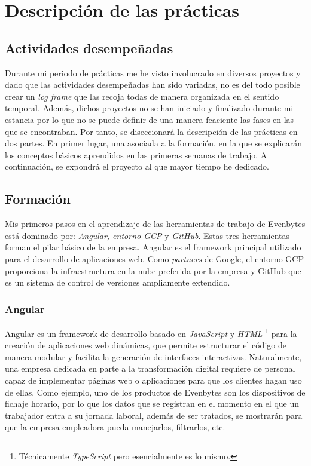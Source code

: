\chapter{Descripción de las prácticas} \label{descripcion de las practicas}
%
%
\section{Actividades desempeñadas} \label{Actividades desempeñadas}
%
Durante mi periodo de prácticas me he visto involucrado en diversos proyectos y dado que las actividades desempeñadas han sido variadas, no es del todo posible crear un \textit{log frame} que las recoja todas de manera organizada en el sentido temporal. Además, dichos proyectos no se han iniciado y finalizado durante mi estancia por lo que no se puede definir de una manera feaciente las fases en las que se encontraban. Por tanto, se diseccionará la descripción de las prácticas en dos partes. En primer lugar, una asociada a la formación, en la que se explicarán los conceptos básicos aprendidos en las primeras semanas de trabajo. A continuación, se expondrá el proyecto al que mayor tiempo he dedicado.
%
%
\section{Formación}
%
%
Mis primeros pasos en el aprendizaje de las herramientas de trabajo de Evenbytes está dominado por: \textit{Angular, entorno GCP} y \textit{GitHub}. Estas tres herramientas forman el pilar básico de la empresa. Angular es el framework principal utilizado para el desarrollo de aplicaciones web. Como \textit{partners} de Google, el entorno GCP proporciona la infraestructura en la nube preferida por la empresa y GitHub que es un sistema de control de versiones ampliamente extendido.
%
%
\subsection{Angular}
%
%
Angular es un framework de desarrollo basado en \textit{JavaScript} y \textit{HTML} \footnote{Técnicamente \textit{TypeScript} pero esencialmente es lo mismo.} para la creación de aplicaciones web dinámicas, que permite estructurar el código de manera modular y facilita la generación de interfaces interactivas. Naturalmente, una empresa dedicada en parte a la transformación digital requiere de personal capaz de implementar páginas web o aplicaciones para que los clientes hagan uso de ellas. Como ejemplo, uno de los productos de Evenbytes son los dispositivos de fichaje horario, por lo que los datos que se registran en el momento en el que un trabajador entra a su jornada laboral, además de ser tratados, se mostrarán para que la empresa empleadora pueda manejarlos, filtrarlos, etc.

